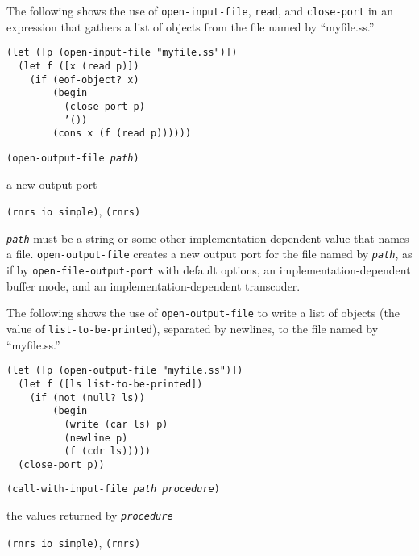 The following shows the use of \texttt{open-input-file}, \texttt{read}, and
\texttt{close-port} in an expression that gathers a list of
objects from the file named by ``myfile.ss.''


\begin{alltt}
(let ([p (open-input-file "myfile.ss")])
  (let f ([x (read p)])
    (if (eof-object? x)
        (begin
          (close-port p)
          '())
        (cons x (f (read p))))))
\end{alltt}

\begin{description}

\label{io_s76}\item[procedure] \texttt{(open-output-file \textit{path})}



\item[returns] a new output port


\item[libraries] \texttt{(rnrs io simple)}, \texttt{(rnrs)}
\end{description}

\texttt{\textit{path}} must be a string or some other implementation-dependent 
value that names a file.
\texttt{open-output-file} creates a new output port for the file named by
\texttt{\textit{path}}, as if by \texttt{open-file-output-port} with default options,
an implementation-dependent buffer mode, and an implementation-dependent
transcoder.

The following shows the use of \texttt{open-output-file} 
to write a list of objects (the value of
\texttt{list-to-be-printed}), separated by newlines, to the file
named by ``myfile.ss.''


\begin{alltt}
(let ([p (open-output-file "myfile.ss")])
  (let f ([ls list-to-be-printed])
    (if (not (null? ls))
        (begin
          (write (car ls) p)
          (newline p)
          (f (cdr ls)))))
  (close-port p))
\end{alltt}

\begin{description}

\label{io_s77}\item[procedure] \texttt{(call-with-input-file \textit{path} \textit{procedure})}



\item[returns] the values returned by \texttt{\textit{procedure}}


\item[libraries] \texttt{(rnrs io simple)}, \texttt{(rnrs)}
\end{description}

